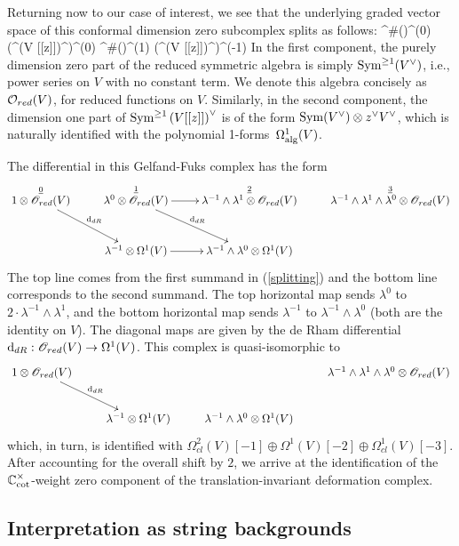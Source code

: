 Returning now to our case of interest, we see that the underlying graded vector space of this conformal dimension zero subcomplex splits as follows:
\be\label{splitting}
\clie^{\#}(\wone)^{\wt(0)} \tensor \left(\Sym^{}\left(V [[z]]\right)^\vee \right)^{\wt(0)} \oplus \clie^{\#}(\wone)^{\wt(1)} \tensor \left(\Sym^{}\left(V [[z]]\right)^\vee\right)^{\wt(-1)}
\ee
In the first component, the purely dimension zero part of the reduced symmetric algebra is simply ${\rm Sym}^{\geq 1}(V^\vee)$, i.e., power series on $V$ with no constant term.
We denote this algebra concisely as $\mathcal O_{red}(V)$, for reduced functions on $V$.
Similarly, in the second component, 
the dimension one part of ${\rm Sym}^{\geq 1}\left(V[[z]]\right)^\vee$ is of the form ${\rm Sym}(V^\vee) \otimes z^\vee V^\vee$, which is naturally identified with the polynomial 1-forms~$\Omega^1_{\rm alg}(V)$. 

The differential in this Gelfand-Fuks complex has the form
\[
\xymatrix{
\overset{\ul{0}}{1 \otimes \sO_{red}(V)} \ar[rd]^{\d_{dR}} & \overset{\ul{1}}{\lambda^0 \otimes \sO_{red}(V)} \ar[r] \ar[rd]^{\d_{dR}} & \overset{\ul{2}}{\lambda^{-1} \wedge \lambda^1 \otimes \sO_{red}(V)} & \overset{\ul{3}}{\lambda^{-1} \wedge \lambda^1 \wedge \lambda^0 \otimes \sO_{red}(V)} \\
 & \lambda^{-1} \otimes \Omega^1(V) \ar[r] & \lambda^{-1} \wedge \lambda^0 \otimes\Omega^1(V) &
}
\]
The top line comes from the first summand in (\ref{splitting}) and the bottom line corresponds to the second summand.
The top horizontal map sends $\lambda^0$ to $2 \cdot \lambda^{-1} \wedge \lambda^1$, 
and the bottom horizontal map sends $\lambda^{-1}$ to $\lambda^{-1} \wedge \lambda^0$ (both are the identity on $V$). 
The diagonal maps are given by the de Rham differential ${\rm d}_{dR} : \mathscr O_{red}(V) \to \Omega^1(V)$. 
This complex is quasi-isomorphic to 
\[
\xymatrix{
1 \otimes \sO_{red}(V) \ar[rd]^{\d_{dR}} & & & \lambda^{-1} \wedge \lambda^1 \wedge \lambda^0 \otimes \sO_{red}(V) \\
 & \lambda^{-1} \otimes \Omega^1(V) & \lambda^{-1} \wedge \lambda^0 \otimes\Omega^1(V) &
}
\]
which, in turn, is identified with $\Omega^{2}_{cl}(V)[-1] \oplus \Omega^1(V)[-2] \oplus \Omega^1_{cl}(V)[-3]$. 
After accounting for the overall shift by $2$, 
we arrive at the identification of the $\mathbb C_{\rm cot}^\times$-weight zero component of the translation-invariant deformation complex.

\subsection{Interpretation as string backgrounds}

